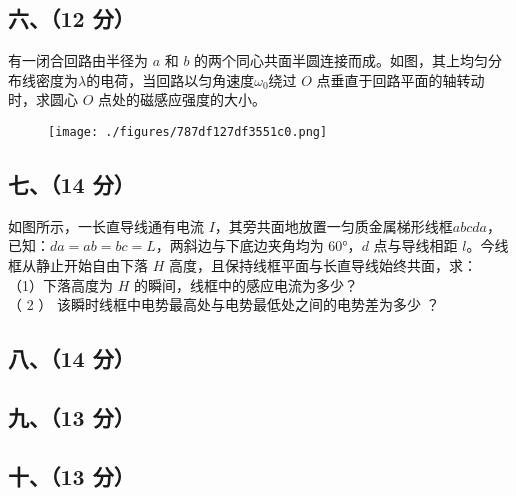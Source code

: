 \subsection{六、（12 分）}
有一闭合回路由半径为 $a$ 和 $b$ 的两个同心共面半圆连接而成。如图，其上均匀分布线密度为$\lambda$的电荷，当回路以匀角速度$\omega_0$绕过 $O$ 点垂直于回路平面的轴转动时，求圆心 $O$ 点处的磁感应强度的大小。
\begin{figure}[ht]
\centering
\texttt{[image: ./figures/787df127df3551c0.png]}
\caption{} \label{fig_NJUD4_5}
\end{figure}
\subsection{七、（14 分）}
如图所示，一长直导线通有电流 $I$，其旁共面地放置一匀质金属梯形线框$abcda$，已知：$da=ab=bc=L$，两斜边与下底边夹角均为 60°，$d$ 点与导线相距 $l$。今线框从静止开始自由下落 $H$ 高度，且保持线框平面与长直导线始终共面，求：\\
（1）下落高度为 $H$ 的瞬间，线框中的感应电流为多少？\\
（ 2 ） 该瞬时线框中电势最高处与电势最低处之间的电势差为多少 ？
\subsection{八、（14 分）}

\subsection{九、（13 分）}

\subsection{十、（13 分）}